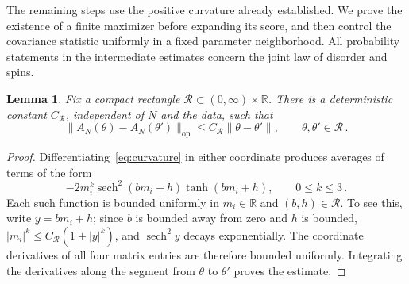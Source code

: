\documentclass[11pt]{amsart}
\numberwithin{equation}{section}
\newtheorem{lemma}[theorem]{Lemma}
\theoremstyle{remark}
\newcommand{\R}{\mathbb R}
\newcommand{\sech}{\operatorname{sech}}
\newcommand{\op}{\mathrm{op}}
\begin{document}
The remaining steps use the positive curvature already established. We prove the existence of a finite maximizer before expanding its score, and then control the covariance statistic uniformly in a fixed parameter neighborhood. All probability statements in the intermediate estimates concern the joint law of disorder and spins.

\begin{lemma}\label{lem:parameter-curvature}
Fix a compact rectangle $\mathcal R\subset(0,\infty)\times\R$. There is a deterministic constant $C_{\mathcal R}$, independent of $N$ and the data, such that
\begin{equation}
 \|A_N(\theta)-A_N(\theta')\|_\op
 \le C_{\mathcal R}\|\theta-\theta'\|,
 \qquad \theta,\theta'\in\mathcal R\,.
 \label{eq:curvature-lipschitz}
\end{equation}
\end{lemma}
\begin{proof}
Differentiating~\eqref{eq:curvature} in either coordinate produces averages of terms of the form
\begin{equation*}
 -2m_i^k\sech^2(bm_i+h)\tanh(bm_i+h),\qquad 0\le k\le3\,.
\end{equation*}
Each such function is bounded uniformly in $m_i\in\R$ and $(b,h)\in\mathcal R$. To see this, write $y=bm_i+h$; since $b$ is bounded away from zero and $h$ is bounded, $|m_i|^k\le C_{\mathcal R}(1+|y|^k)$, and $\sech^2 y$ decays exponentially. The coordinate derivatives of all four matrix entries are therefore bounded uniformly. Integrating the derivatives along the segment from $\theta$ to $\theta'$ proves the estimate.
\end{proof}
\end{document}
